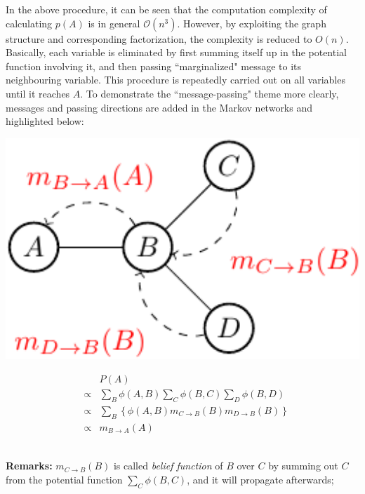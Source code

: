 In the above procedure, it can be seen that the computation complexity of calculating $p(A)$ is in general $\mathcal{O}(n^3)$. However, by exploiting 
the graph structure and corresponding factorization, the complexity is reduced to $O(n)$. Basically, each variable is eliminated by first summing 
itself up in the potential function involving it, and then passing ``marginalized" message to its neighbouring variable. This procedure is repeatedly carried out 
on all variables until it reaches $A$. To demonstrate the ``message-passing" theme more clearly,  messages and passing directions are added in the Markov networks and  
highlighted below:
\newline
\begin{minipage}[c]{0.4\textwidth}
      \centering
      \includegraphics[width=1.1\textwidth]{./Figures/message_passing_1}
\end{minipage}
\begin{minipage}[c]{0.6\textwidth}
 \begin{equation*}
  \begin{array}{rcl}
  & & P(A) \\
  &\propto& \sum_{B}\phi(A,B) \sum_C \phi(B,C) \sum_D \phi(B,D)\\ 
  &\propto& \sum_{B} \left\{\phi(A,B) m_{C\rightarrow B}(B) m_{D\rightarrow B}(B) \right\} \\
  &\propto& m_{B\rightarrow A}(A)
  \end{array}
 \end{equation*}
\end{minipage}\\
\newline 
\textbf{Remarks:}
$m_{C\rightarrow B}(B)$ is called \emph{belief function} of $B$ over $C$ by summing out $C$ from the potential function $\sum_C \phi(B,C)$, and it will propagate afterwards; 


